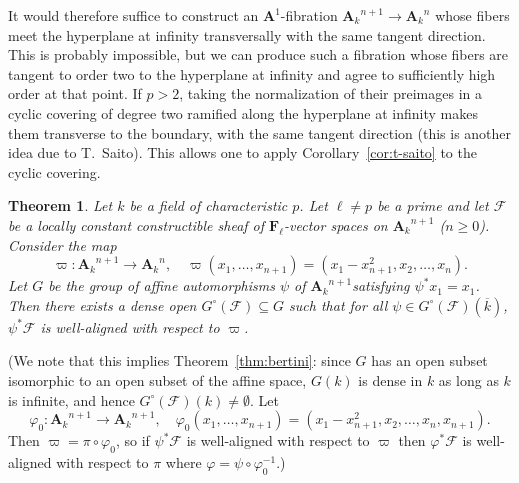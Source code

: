 \documentclass[twoside]{amsart}
\renewcommand{\AA}{\mathbf{A}}
\newcommand{\FF}{\mathbf{F}}
\newcommand{\Ff}{\mathscr{F}}
\newcommand{\ANK}[2]{{\AA_{#2}}^{\! \! \! \!  #1}} %
\newcommand{\AN}[1]{\ANK{#1}{k}}
\renewcommand{\phi}{\varphi}
\renewcommand{\to}{\longrightarrow}
\renewcommand{\bar}{\overline}
\theoremstyle{plain}
\newtheorem{theorem}[subsubsection]{Theorem}
\theoremstyle{definition}
\theoremstyle{remark}
\numberwithin{equation}{subsection}
\begin{document}
It would therefore suffice to construct an $\AA^1$-fibration $\AN{n+1}\to \AN n$  whose fibers meet the hyperplane at infinity transversally with the same tangent direction. This is probably impossible, but we can produce such a fibration whose fibers are tangent to order two to the hyperplane at infinity and agree to sufficiently high order at that point. If $p>2$, taking the normalization of their preimages in a cyclic covering of degree two ramified along the hyperplane at infinity makes them transverse to the boundary, with the same tangent direction (this is another idea due to T.~Saito). This allows one to apply Corollary~\ref{cor:t-saito} to the cyclic covering.

\begin{theorem} \label{thm:bertini-general}
	Let $k$ be a field of characteristic $p$. Let $\ell \neq p$ be a prime and let $\Ff$ be a locally constant constructible sheaf of $\FF_\ell$-vector spaces on $\AN{n+1}$ ($n\geq 0$). Consider the map 
	\[ 
		\varpi\colon \AN{n+1}\to \AN{n}, \quad \varpi(x_1, \ldots, x_{n+1}) = (x_1 - x_{n+1}^2, x_2, \ldots, x_n).
	\]
	Let $G$ be the group of affine automorphisms $\psi$ of $\AN{n+1}$satisfying $\psi^* x_1 = x_1$. Then there exists a dense open $G^\circ(\Ff)\subseteq G$ such that for all $\psi\in G^\circ(\Ff)(\bar k)$, $\psi^* \Ff$ is well-aligned with respect to $\varpi$.
\end{theorem}

(We note that this implies Theorem~\ref{thm:bertini}: since $G$ has an open subset isomorphic to an open subset of the affine space, $G(k)$ is dense in $k$ as long as $k$ is infinite, and hence $G^\circ(\Ff)(k)\neq\emptyset$. Let 
\[
	\phi_0\colon \AN{n+1}\to\AN{n+1}, \quad \phi_0(x_1, \ldots, x_{n+1}) = (x_1 - x_{n+1}^2, x_2, \ldots, x_n, x_{n+1}).
\] 
Then $\varpi = \pi\circ \phi_0$, so if $\psi^* \Ff$ is well-aligned with respect to $\varpi$ then $\phi^* \Ff$ is well-aligned with respect to $\pi$ where $\phi = \psi\circ\phi_0^{-1}$.)
\end{document}
